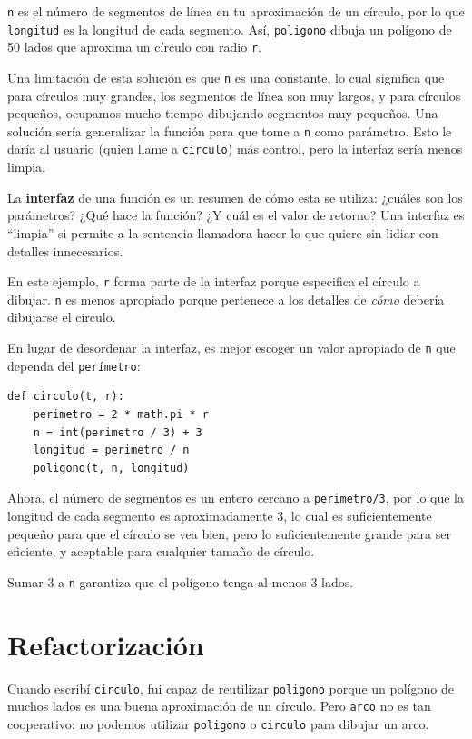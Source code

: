 \documentclass[10pt]{book}
\begin{document}
{\tt n} es el número de segmentos de línea en tu aproximación de un círculo,
por lo que {\tt longitud} es la longitud de cada segmento.  Así, {\tt poligono}
dibuja un polígono de 50 lados que aproxima un círculo con radio {\tt r}.

Una limitación de esta solución es que {\tt n} es una constante, lo cual
significa que para círculos muy grandes, los segmentos de línea son muy largos, y
para círculos pequeños, ocupamos mucho tiempo dibujando segmentos muy pequeños.  Una
solución sería generalizar la función para que tome a {\tt n} como
parámetro.  Esto le daría al usuario (quien llame a {\tt circulo})
más control, pero la interfaz sería menos limpia.

La {\bf interfaz} de una función es un resumen de cómo esta se utiliza: ¿cuáles
son los parámetros?  ¿Qué hace la función?  ¿Y cuál es el valor de
retorno?  Una interfaz es ``limpia'' si permite a la sentencia llamadora hacer
lo que quiere sin lidiar con detalles innecesarios.

En este ejemplo, {\tt r} forma parte de la interfaz porque
especifica el círculo a dibujar.  {\tt n} es menos apropiado
porque pertenece a los detalles de {\em cómo} debería dibujarse
el círculo.

En lugar de desordenar la interfaz, es mejor
escoger un valor apropiado de {\tt n}
que dependa del {\tt perímetro}:

\begin{verbatim}
def circulo(t, r):
    perimetro = 2 * math.pi * r
    n = int(perimetro / 3) + 3
    longitud = perimetro / n
    poligono(t, n, longitud)
\end{verbatim}
%
Ahora, el número de segmentos es un entero cercano a {\tt perimetro/3},
por lo que la longitud de cada segmento es aproximadamente 3, lo cual es suficientemente
pequeño para que el círculo se vea bien, pero lo suficientemente grande para ser eficiente,
y aceptable para cualquier tamaño de círculo.

Sumar 3 a {\tt n} garantiza que el polígono tenga al menos 3 lados.


\section{Refactorización}
\label{refactoring}

Cuando escribí {\tt circulo}, fui capaz de reutilizar {\tt poligono}
porque un polígono de muchos lados es una buena aproximación de un círculo.
Pero {\tt arco} no es tan cooperativo: no podemos utilizar {\tt poligono}
o {\tt circulo} para dibujar un arco.
\end{document}
